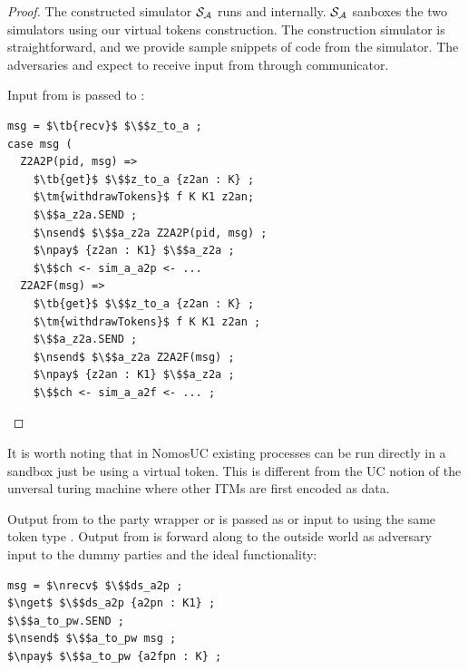 \begin{proof}
The constructed simulator $\mathcal{S}_\mathcal{A}$ runs \A and \DS internally.
$\mathcal{S}_\mathcal{A}$ sanboxes the two simulators using our virtual tokens construction.
The construction simulator is straightforward, and we provide sample snippets of code from the simulator.
The adversaries \A and \DS expect to receive input from \Z through communicator.

Input from \Z is passed to \A:
\begin{lstlisting}[basicstyle=\footnotesize\BeraMonottFamily, frame=single,  mathescape]
msg = $\tb{recv}$ $\$$z_to_a ;
case msg (
  Z2A2P(pid, msg) =>
    $\tb{get}$ $\$$z_to_a {z2an : K} ;
    $\tm{withdrawTokens}$ f K K1 z2an;
    $\$$a_z2a.SEND ;
    $\nsend$ $\$$a_z2a Z2A2P(pid, msg) ;
    $\npay$ {z2an : K1} $\$$a_z2a ;
    $\$$ch <- sim_a_a2p <- ... 
  Z2A2F(msg) =>
    $\tb{get}$ $\$$z_to_a {z2an : K} ;
    $\tm{withdrawTokens}$ f K K1 z2an ;
    $\$$a_z2a.SEND ;
    $\nsend$ $\$$a_z2a Z2A2F(msg) ;
    $\npay$ {z2an : K1} $\$$a_z2a ;
    $\$$ch <- sim_a_a2f <- ... ;
\end{lstlisting}
\end{proof}
It is worth noting that in NomosUC existing processes can be run directly in a sandbox just be using a virtual token.
This is different from the UC notion of the unversal turing machine where other ITMs are first encoded as data.

Output from \A to the party wrapper or \F is passed as  or  input to \DS using the same token type .
Output from \DS is forward along to the outside world as adversary input to the dummy parties and the ideal functionality:
\begin{lstlisting}[basicstyle=\footnotesize\BeraMonottFamily, frame=single, mathescape]
msg = $\nrecv$ $\$$ds_a2p ;
$\nget$ $\$$ds_a2p {a2pn : K1} ;
$\$$a_to_pw.SEND ;
$\nsend$ $\$$a_to_pw msg ;
$\npay$ $\$$a_to_pw {a2fpn : K} ;
\end{lstlisting}
